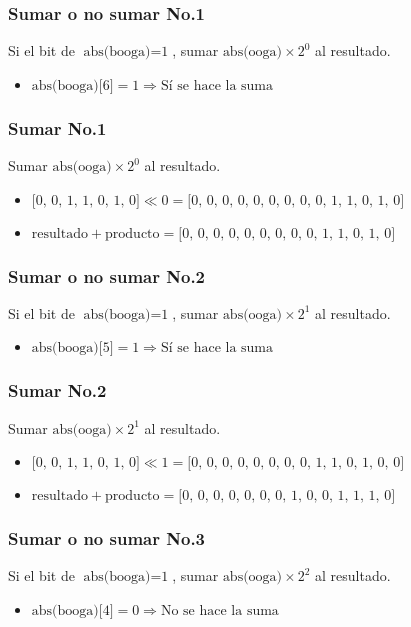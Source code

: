 \documentclass{beamer}
\begin{document}
\begin{frame}
\frametitle{Sumar o no sumar No.1}
Si el bit de $\text{abs(booga)}=\text{1}$, sumar $\text{abs(ooga)}\times\text{2}^{\text{0}}$ al resultado.
\begin{itemize}
\item $\text{abs(booga)[6]}=\text{1}\Longrightarrow\text{Sí se hace la suma}$
\end{itemize}
\end{frame}
\begin{frame}
\frametitle{Sumar No.1}
Sumar $\text{abs(ooga)}\times\text{2}^{\text{0}}$ al resultado.
\begin{itemize}
\item $\text{[0, 0, 1, 1, 0, 1, 0]}\ll\text{0}=\text{[0, 0, 0, 0, 0, 0, 0, 0, 0, 1, 1, 0, 1, 0]}$
\item $\text{resultado}+\text{producto}=\text{[0, 0, 0, 0, 0, 0, 0, 0, 0, 1, 1, 0, 1, 0]}$
\end{itemize}
\end{frame}
\begin{frame}
\frametitle{Sumar o no sumar No.2}
Si el bit de $\text{abs(booga)}=\text{1}$, sumar $\text{abs(ooga)}\times\text{2}^{\text{1}}$ al resultado.
\begin{itemize}
\item $\text{abs(booga)[5]}=\text{1}\Longrightarrow\text{Sí se hace la suma}$
\end{itemize}
\end{frame}
\begin{frame}
\frametitle{Sumar No.2}
Sumar $\text{abs(ooga)}\times\text{2}^{\text{1}}$ al resultado.
\begin{itemize}
\item $\text{[0, 0, 1, 1, 0, 1, 0]}\ll\text{1}=\text{[0, 0, 0, 0, 0, 0, 0, 0, 1, 1, 0, 1, 0, 0]}$
\item $\text{resultado}+\text{producto}=\text{[0, 0, 0, 0, 0, 0, 0, 1, 0, 0, 1, 1, 1, 0]}$
\end{itemize}
\end{frame}
\begin{frame}
\frametitle{Sumar o no sumar No.3}
Si el bit de $\text{abs(booga)}=\text{1}$, sumar $\text{abs(ooga)}\times\text{2}^{\text{2}}$ al resultado.
\begin{itemize}
\item $\text{abs(booga)[4]}=\text{0}\Longrightarrow\text{No se hace la suma}$
\end{itemize}
\end{frame}
\end{document}
